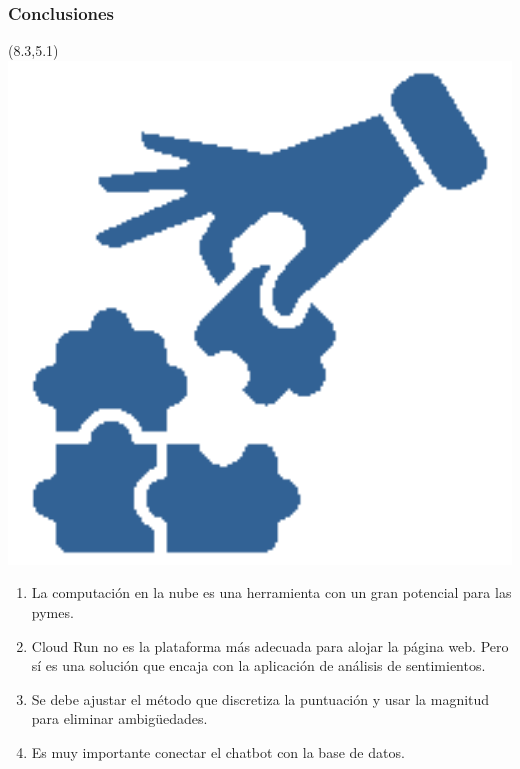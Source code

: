 \documentclass[10pt]{beamer}
\begin{document}
\begin{frame}
\frametitle{Conclusiones}
\begin{textblock}{2.5}(8.3,5.1)
	\includegraphics[width = 1\textwidth]{Figuras/conclusions.png}
\end{textblock}
\begin{center}
    \begin{minipage}{\textwidth}
      \begin{enumerate}
        \item La computación en la nube es una herramienta con un gran potencial para las pymes. \vspace{0.6cm} \pause
        \item Cloud Run no es la plataforma más adecuada para alojar la página web. Pero sí es una solución que encaja con la aplicación de análisis de sentimientos. \vspace{0.6cm} \pause
        \item Se debe ajustar el método que discretiza la puntuación y usar la magnitud para eliminar ambigüedades. \vspace{0.6cm} \pause
		\item Es muy importante conectar el chatbot con \newline la base de datos. \vspace{0.5cm}
      \end{enumerate} 
    \end{minipage}
\end{center}
\end{frame}
\end{document}
